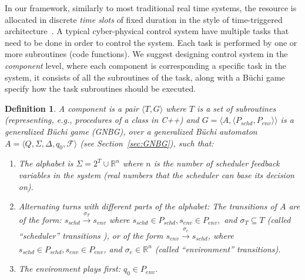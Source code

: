 \documentclass[ twoside, 12pt ]{article}
\newcommand\R{{\mathbb R}}
\newtheorem{dfn}{Definition} %
\newcommand{\buchi}{B\"uchi }
\begin{document}
In our framework, similarly to most traditional real time systems, the resource is allocated in discrete \textit{time slots} of fixed duration in the style of time-triggered architecture~\cite{RTComposer}.
A typical cyber-physical control system have multiple tasks that need to be done in order to control the system.
Each task is performed by one or more subroutines (code functions).
We suggest designing control system in the \textit{component} level, where each component is corresponding a specific task in the system, it consists of all the subroutines of the task, along with a \buchi game specify how the task subroutines should be executed.

\begin{dfn}
    A component is a pair $\langle T,G\rangle$ where $T$ is a set of subroutines (representing, e.g., procedures of a class in C++) and $G=\langle A,\langle P_{schd}, P_{env}\rangle \rangle$ is a generalized B{\"u}chi game (GNBG), over a generalized \buchi automaton $A= \langle Q,\Sigma,\Delta,q_0,\mathcal{F} \rangle $ (see Section~\ref{sec:GNBG}), such that:
    \begin{enumerate}
        \item The \textit{alphabet} is $\Sigma = 2^{T} \cup \R^n$ where $n$ is the number of scheduler feedback variables in the system (real numbers that the scheduler can base its decision on).
        \item 
        Alternating turns with different parts of the alphabet:
       	The transitions of $A$ are of the form: $s_{schd} \xrightarrow[]{\sigma_{T}} s_{env}$ where $s_{schd} \in P_{schd}, s_{env} \in P_{env},$ and $\sigma_{T} \subseteq T$ (called  ``scheduler'' transitions ),  or of the form $s_{env} \xrightarrow[]{\sigma_{e}} s_{schd}$, where $s_{schd} \in P_{schd}, s_{env} \in P_{env}$, and $\sigma_{e} \in \R^n$ (called ``environment'' transitions).
        \item The environment plays first: $q_0 \in P_{env}$.
    \end{enumerate}
\end{dfn}
\end{document}
